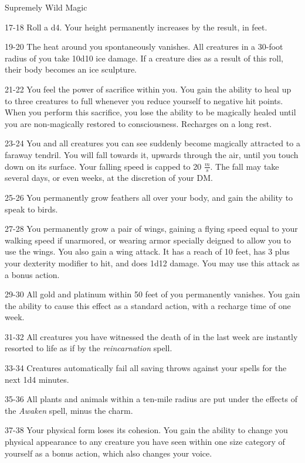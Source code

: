 \begin{rolltable}{Supremely Wild Magic}
\item[17-18]  Roll a d4. Your height permanently increases by the result, in feet.
\item[19-20] The heat around you spontaneously vanishes.
All creatures in a 30-foot radius of you take 10d10 ice damage. 
If a creature dies as a result of this roll, their body becomes an ice sculpture.
\item[21-22] You feel the power of sacrifice within you.
You gain the ability to heal up to three creatures to full whenever you reduce yourself to negative hit points.
When you perform this sacrifice, you lose the ability to be magically healed until you are non-magically restored to consciousness.
Recharges on a long rest.
\item[23-24] You and all creatures you can see suddenly become magically attracted to a faraway tendril. 
You will fall towards it, upwards through the air, until you touch down on its surface.
Your falling speed is capped to 20 $\frac{m}{s}$.
The fall may take several days, or even weeks, at the discretion of your DM.
\item[25-26] You permanently grow feathers all over your body, and gain the ability to speak to birds.
\item[27-28] You permanently grow a pair of wings, gaining a flying speed equal to your walking speed if unarmored, or wearing armor specially deigned to allow you to use the wings.
You also gain a wing attack. 
It has a reach of 10 feet, has 3 plus your dexterity modifier to hit, and does 1d12 damage.
You may use this attack as a bonus action.
\item[29-30] All gold and platinum within 50 feet of you permanently vanishes.
You gain the ability to cause this effect as a standard action, with a recharge time of one week.
\item[31-32] All creatures you have witnessed the death of in the last week are instantly resorted to life as if by the \textit{reincarnation} spell.
\item[33-34] Creatures automatically fail all saving throws against your spells for the next 1d4 minutes.
\item[35-36] All plants and animals within a ten-mile radius are put under the effects of the \textit{Awaken} spell, minus the charm.
\item[37-38] Your physical form loses its cohesion.
You gain the ability to change you physical appearance to any creature you have seen within one size category of yourself as a bonus action, which also changes your voice.

\end{rolltable}

